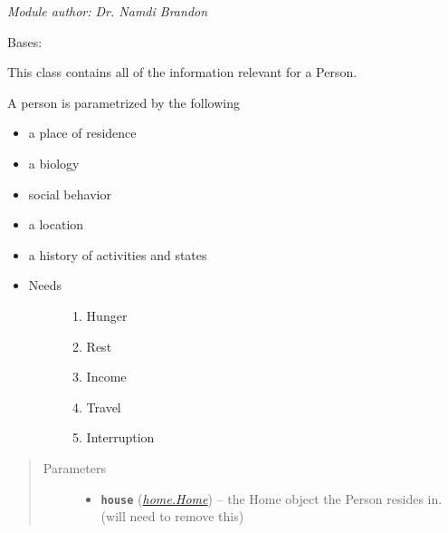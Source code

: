 \documentclass[letterpaper,10pt,english]{sphinxmanual}
\begin{document}
\emph{Module author: Dr. Namdi Brandon}

\begin{fulllineitems}
\label{person:person.Person}
Bases: 

This class contains all of the information relevant for a Person.

A person is parametrized by the following
\begin{itemize}
\item {} 
a place of residence

\item {} 
a biology

\item {} 
social behavior

\item {} 
a location

\item {} 
a history of activities and states

\item {} \begin{description}
\item[{Needs}] \leavevmode\begin{enumerate}
\item {} 
Hunger

\item {} 
Rest

\item {} 
Income

\item {} 
Travel

\item {} 
Interruption

\end{enumerate}

\end{description}

\end{itemize}
\begin{quote}\begin{description}
\item[{Parameters}] \leavevmode\begin{itemize}
\item {} 
\textbf{\texttt{house}} ({\hyperref[home:home.Home]{\emph{\emph{home.Home}}}}) -- the Home object the Person resides in. (will need to remove this)


\end{itemize}
\end{description}
\end{quote}
\end{fulllineitems}
\end{document}
